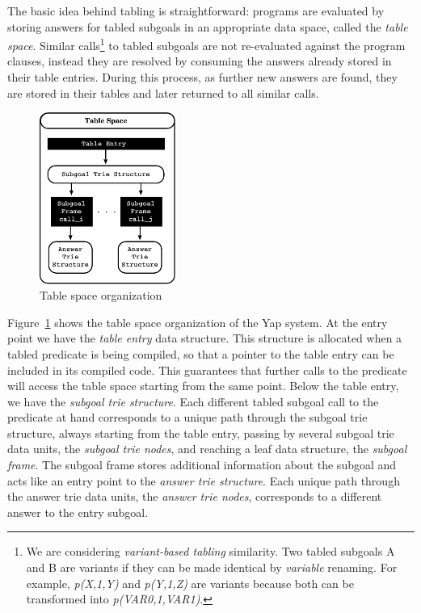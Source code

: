\documentclass{llncs}
\begin{document}
The basic idea behind tabling is straightforward: programs are
evaluated by storing answers for tabled subgoals in an appropriate
data space, called the \emph{table space}. Similar calls\footnote{We
  are considering \emph{variant-based tabling} similarity. Two tabled
  subgoals A and B are variants if they can be made identical by
  \emph{variable} renaming. For example, \emph{p(X,1,Y)} and
  \emph{p(Y,1,Z)} are variants because both can be transformed into
  \emph{p(VAR0,1,VAR1)}.} to tabled subgoals are not re-evaluated
against the program clauses, instead they are resolved by consuming
the answers already stored in their table entries. During this
process, as further new answers are found, they are stored in their
tables and later returned to all similar calls.

\begin{figure}
\vspace{-\intextsep}
\centering
\includegraphics[width=4.5cm]{figures/table-space.pdf}
\caption{Table space organization}
\label{fig_table_space}
\vspace{-0.5\intextsep}
\end{figure}

Figure~\ref{fig_table_space} shows the table space organization of the
Yap system. At the entry point we have the \emph{table entry} data
structure. This structure is allocated when a tabled predicate is
being compiled, so that a pointer to the table entry can be included
in its compiled code. This guarantees that further calls to the
predicate will access the table space starting from the same
point. Below the table entry, we have the \emph{subgoal trie
  structure}. Each different tabled subgoal call to the predicate at
hand corresponds to a unique path through the subgoal trie structure,
always starting from the table entry, passing by several subgoal trie
data units, the \emph{subgoal trie nodes}, and reaching a leaf data
structure, the \emph{subgoal frame}. The subgoal frame stores
additional information about the subgoal and acts like an entry point
to the \emph{answer trie structure}. Each unique path through the
answer trie data units, the \emph{answer trie nodes}, corresponds to a
different answer to the entry subgoal.
\end{document}
